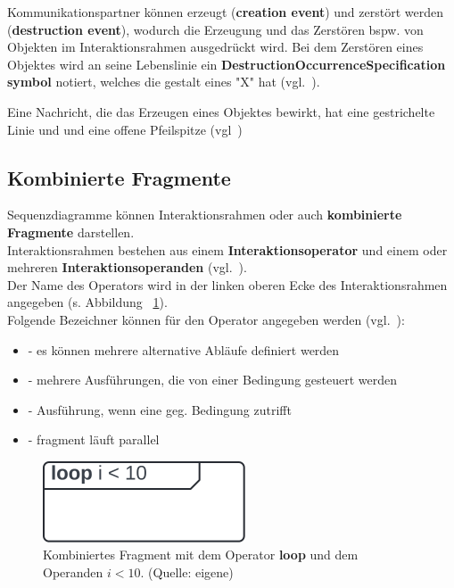 \noindent
Kommunikationspartner können erzeugt (\textbf{creation event}) und zerstört werden (\textbf{destruction event}), wodurch die Erzeugung und das Zerstören bspw. von Objekten im Interaktionsrahmen ausgedrückt wird.
Bei dem Zerstören eines Objektes wird an seine Lebenslinie ein \textbf{DestructionOccurrenceSpecification symbol} notiert, welches die gestalt eines "X" hat (vgl.~\cite[578]{OMG17}).

\begin{tcolorbox}[title=creation event, colback=white]
    Eine Nachricht, die das Erzeugen eines Objektes bewirkt, hat eine gestrichelte Linie und und eine offene Pfeilspitze (vgl~\cite[577]{OMG17})
\end{tcolorbox}

\subsection{Kombinierte Fragmente}
Sequenzdiagramme können Interaktionsrahmen oder auch \textbf{kombinierte Fragmente} darstellen.\\
Interaktionsrahmen bestehen aus einem \textbf{Interaktionsoperator} und einem oder mehreren \textbf{Interaktionsoperanden} (vgl.~\cite[582]{OMG17}).\\
Der Name des Operators wird in der linken oberen Ecke des Interaktionsrahmen angegeben (s. Abbildung ~\ref{fig:interaktionsoperand}).\\
Folgende Bezeichner können für den Operator angegeben werden (vgl.~\cite[583]{OMG17}):

\begin{itemize}
    \item {} - es können mehrere alternative Abläufe definiert werden
    \item {} - mehrere Ausführungen, die von einer Bedingung gesteuert werden
    \item {} - Ausführung, wenn eine geg. Bedingung zutrifft
    \item {} - fragment läuft parallel
\end{itemize}

\begin{figure}
    \centering
    \includegraphics[scale=0.5]{part three/Sequenzdiagramme/img/interaktionsoperand}
    \caption{Kombiniertes Fragment mit dem Operator \textbf{loop} und dem Operanden $i < 10$. (Quelle: eigene)}
    \label{fig:interaktionsoperand}
\end{figure}

